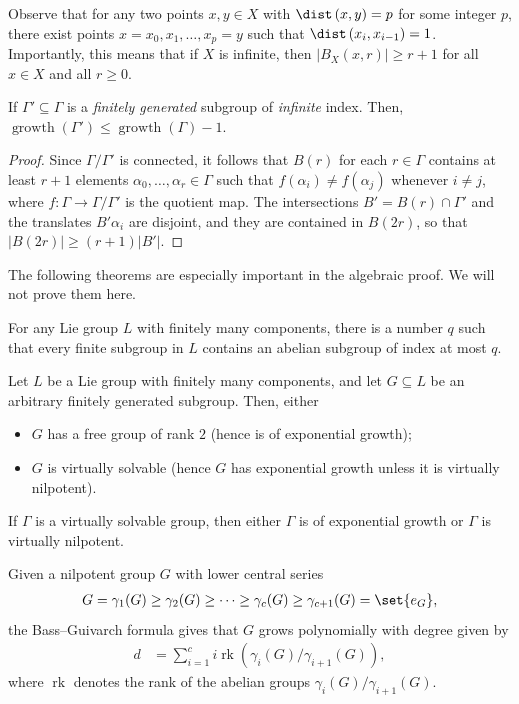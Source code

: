 \documentclass[10pt]{mypackage}
\begin{document}
Observe that for any two points $x,y\in X$ with $\dist\left( x,y \right) = p$ for some integer $p$, there exist points $x = x_0,x_1,\dots,x_p=y$ such that $\dist\left( x_i,x_{i-1} \right) = 1$. Importantly, this means that if $X$ is infinite, then $\left\vert B_X(x,r) \right\vert\geq r+1$ for all $x\in X$ and all $r\geq 0$.
\begin{lemma}
  If $\Gamma'\subseteq \Gamma$ is a \textit{finitely generated} subgroup of \textit{infinite} index. Then, $\operatorname{growth}\left( \Gamma' \right)\leq \operatorname{growth}\left( \Gamma \right)-1$.
\end{lemma}
\begin{proof}
  Since $\Gamma/\Gamma'$ is connected, it follows that $B(r)$ for each $r\in \Gamma$ contains at least $r+1$ elements $\alpha_0,\dots,\alpha_r\in \Gamma$ such that $f\left( \alpha_i \right)\neq f\left( \alpha_j \right)$ whenever $i\neq j$, where $f\colon \Gamma\to \Gamma/\Gamma'$ is the quotient map. The intersections $B' = B(r)\cap \Gamma'$ and the translates $B'\alpha_i$ are disjoint, and they are contained in $B\left( 2r \right)$, so that $\left\vert B\left( 2r \right) \right\vert\geq \left( r+1 \right)\left\vert B' \right\vert$.
\end{proof}
The following theorems are especially important in the algebraic proof. We will not prove them here.
\begin{theorem}
  For any Lie group $L$ with finitely many components, there is a number $q$ such that every finite subgroup in $L$ contains an abelian subgroup of index at most $q$.
\end{theorem}
\begin{theorem}
  Let $L$ be a Lie group with finitely many components, and let $G\subseteq L$ be an arbitrary finitely generated subgroup. Then, either
  \begin{itemize}
    \item $G$ has a free group of rank $2$ (hence is of exponential growth);
    \item $G$ is virtually solvable (hence $G$ has exponential growth unless it is virtually nilpotent).
  \end{itemize}
\end{theorem}
\begin{theorem}
  If $\Gamma$ is a virtually solvable group, then either $\Gamma$ is of exponential growth or $\Gamma$ is virtually nilpotent.
\end{theorem}
\begin{remark}
  Given a nilpotent group $G$ with lower central series
  \begin{align*}
    G = \gamma_1(G) \geq \gamma_2(G)\geq\cdots\geq \gamma_c(G)\geq \gamma_{c+1}(G) = \set{e_G},
  \end{align*}
  the Bass--Guivarch formula gives that $G$ grows polynomially with degree given by
  \begin{align*}
    d &= \sum_{i=1}^{c}i\operatorname{rk}\left( \gamma_i(G)/\gamma_{i+1}(G) \right),
  \end{align*}
  where $\operatorname{rk}$ denotes the rank of the abelian groups $\gamma_i(G)/\gamma_{i+1}(G)$.
\end{remark}
\end{document}
